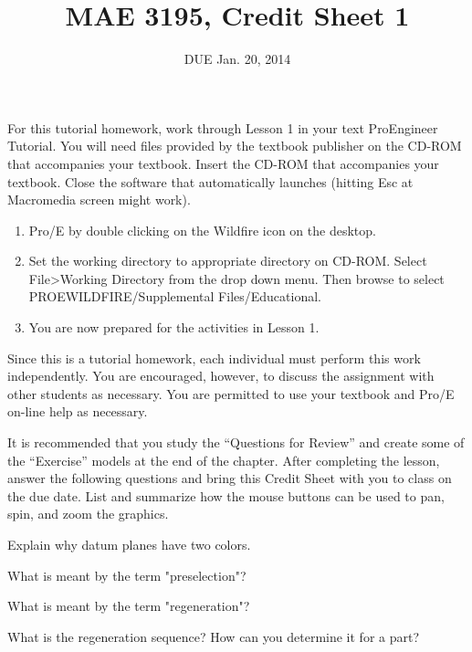 \documentclass{homework}
\title{MAE 3195, Credit Sheet 1}
\author{DUE Jan. 20, 2014}
\begin{document}
For this tutorial homework, work through Lesson 1 in your text ProEngineer Tutorial. You will need files provided by the textbook publisher on the CD-ROM that accompanies your textbook. Insert the CD-ROM that accompanies your textbook. Close the software that automatically launches (hitting Esc at Macromedia screen might work).

\begin{enumerate}
\item Pro/E by double clicking on the Wildfire icon on the desktop.
\item Set the working directory to appropriate directory on CD-ROM. Select File>Working Directory from the drop down menu. Then browse to select PROEWILDFIRE/Supplemental Files/Educational.
\item You are now prepared for the activities in Lesson 1.
\end{enumerate} 

Since this is a tutorial homework, each individual must perform this work independently. You are encouraged, however, to discuss the assignment with other students as necessary. You are permitted to use your textbook and Pro/E on-line help as necessary.

It is recommended that you study the “Questions for Review” and create some of the “Exercise” models at the end of the chapter. After completing the lesson, answer the following questions and bring this Credit Sheet with you to class on the due date.
\problem{} List and summarize how the mouse buttons can be used to pan, spin, and zoom the graphics.
\solution

\problem{} Explain why datum planes have two colors.
\solution

\problem{} What is meant by the term "preselection"?
\solution

\problem{} What is meant by the term "regeneration"?
\solution

\problem{} What is the regeneration sequence? How can you determine it for a part?
\solution
\end{document}
